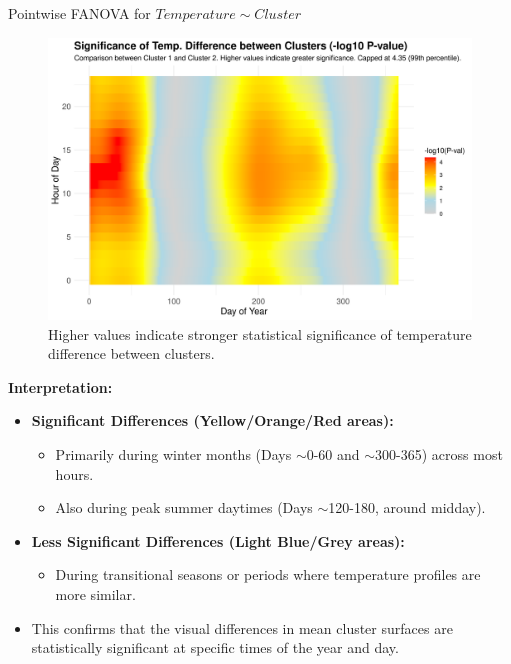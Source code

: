 \documentclass[svgnames, 12pt]{beamer}
\begin{document}
\begin{frame}{Pointwise FANOVA for $Temperature \sim Cluster$}
  \begin{figure}
    \includegraphics[width=0.80\linewidth]{../data/output/figures/pointwise_anova_clusters_heatmap.png}
    \caption{Higher values indicate stronger statistical significance of temperature difference between clusters.}
  \end{figure}
  \textbf{Interpretation:}
  \begin{itemize}
    \item \textbf{Significant Differences (Yellow/Orange/Red areas):}
        \begin{itemize}
            \item Primarily during winter months (Days $\sim$0-60 and $\sim$300-365) across most hours.
            \item Also during peak summer daytimes (Days $\sim$120-180, around midday).
        \end{itemize}
    \item \textbf{Less Significant Differences (Light Blue/Grey areas):}
        \begin{itemize}
            \item During transitional seasons or periods where temperature profiles are more similar.
        \end{itemize}
    \item This confirms that the visual differences in mean cluster surfaces are statistically significant at specific times of the year and day.
  \end{itemize}
\end{frame}


\end{document}
